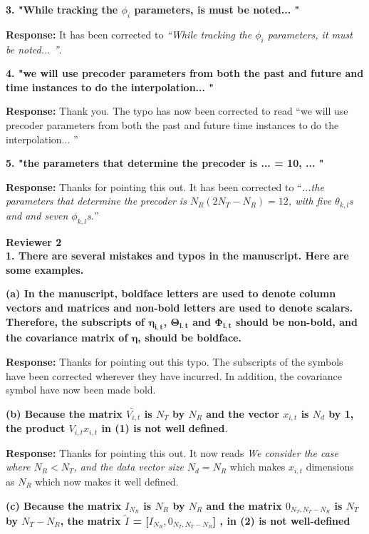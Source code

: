 \documentclass[12pt]{letter}
\begin{document}
\textbf{3. "While tracking the $\phi_i$ parameters, is must be noted... "}

\textbf{Response:} It has been corrected to \emph{``While tracking the $\phi_i$ parameters, it must be noted... ''}.

\textbf{4. "we will use precoder parameters from both the past and future and
time instances to do the interpolation... "}

\textbf{Response:} Thank you. The typo has now been corrected to read
``we will use precoder parameters from both the past and future time instances to do the interpolation... ''

\textbf{5. "the parameters that determine the precoder is ...  = 10, ... "}

\textbf{Response:} Thanks for pointing this out. It has been corrected to ``\emph{...the parameters that determine the precoder is
$N_{R}(2N_{T} - N_R) = 12$, with five $\theta_{k,l}$s and and seven
$\phi_{k,l}$s.}''

\textbf{Reviewer 2}\\

\textbf{1. There are several mistakes and typos in the manuscript. Here are some examples.}

\textbf{(a) In the manuscript, boldface letters are used to denote column vectors and matrices and non-bold letters are used to denote scalars. Therefore, the subscripts of $\boldsymbol{\eta_{i,t}}$, $\boldsymbol{\Theta_{i,t}}$ and $\boldsymbol{\Phi_{i,t}}$ should be non-bold, and the covariance matrix of $\boldsymbol{\eta}$, should be boldface.}

\textbf{Response:} Thanks for pointing out this typo. The subscripts
of the symbols have been corrected wherever they have incurred. In addition,
the covariance symbol have now been made bold.

\textbf{(b) Because the matrix $\tilde{V_{i,t}}$ is $N_T$ by $N_R$ and
  the vector $x_{i,t}$ is $N_d$ by 1, the product $V_{i,t}x_{i,t}$ in
  (1) is not well defined}.

\textbf{Response:} Thanks for pointing this out.  It now reads
\emph{We consider the case where $N_R < N_T$, and the data vector size
  $N_d = N_R$} which makes $x_{i,t}$ dimensions as $N_R$ which now
makes it well defined.

\textbf{(c) Because the matrix $I_{N_R}$ is $N_R$ by $N_R$ and the
  matrix $0_{N_T , N_T - N_R }$ is $N_T$ by $N_T - N_R$, the matrix
  $\tilde{I}$ = [$I_{N_R}, 0_{N_T, N_T - N_R }$] , in (2) is not
  well-defined}
\end{document}
